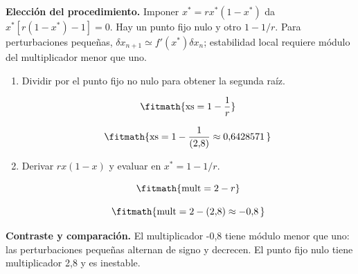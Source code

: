 \noindent\textbf{Elección del procedimiento.} Imponer $x^*=rx^*(1-x^*)$ da $x^*[r(1-x^*)-1]=0$. Hay un punto fijo nulo y otro $1-1/r$. Para perturbaciones pequeñas, $\delta x_{n+1}\simeq f\prime(x^*)\delta x_n$; estabilidad local requiere módulo del multiplicador menor que uno.

\begin{enumerate}

\item Dividir por el punto fijo no nulo para obtener la segunda raíz.

\[\fitmath{\mathrm{xs}=1-\frac{1}{r}}\]

\[\fitmath{\mathrm{xs}=1-\frac{1}{(2{,}8)}\approx 0{,}6428571\,}\]

\item Derivar $rx(1-x)$ y evaluar en $x^*=1-1/r$.

\[\fitmath{\mathrm{mult}=2-r}\]

\[\fitmath{\mathrm{mult}=2-(2{,}8)\approx -0{,}8\,}\]

\end{enumerate}

\noindent\textbf{Contraste y comparación.} El multiplicador -0,8 tiene módulo menor que uno: las perturbaciones pequeñas alternan de signo y decrecen. El punto fijo nulo tiene multiplicador 2,8 y es inestable.
